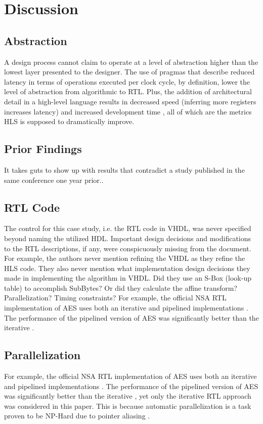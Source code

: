 \documentclass[11pt,journal,compsoc, onecolumn]{IEEEtran}
\begin{document}
\section{Discussion}
\subsection{Abstraction}
A design process cannot claim to operate at a level of abstraction higher than the lowest layer presented to the designer. The use of pragmas that describe reduced latency in terms of operations executed per clock cycle, by definition, lower the level of abstraction from algorithmic to RTL. Plus, the addition of architectural detail in a high-level language results in decreased speed (inferring more registers increases latency) and increased development time \cite{bsv}, all of which are the metrics HLS is supposed to dramatically improve.
\subsection{Prior Findings}
It takes guts to show up with results that contradict a study published in the same conference one year prior\cite{skalicky}..
\subsection{RTL Code}\label{sec:rtl}
The control for this case study, i.e. the RTL code in VHDL, was never specified beyond naming the utilized HDL. Important design decisions and modifications to the RTL descriptions, if any, were conspicuously missing from the document. For example, the authors never mention refining the VHDL as they refine the HLS code. They also never mention what implementation design decisions they made in implementing the algorithm in VHDL. Did they use an S-Box (look-up table) to accomplish SubBytes? Or did they calculate the affine transform? Parallelization? Timing constraints?  
For example, the official NSA RTL implementation of AES uses both an iterative and pipelined implementations \cite{nsa}. The performance of the pipelined version of AES was significantly better than the iterative \cite{nsaweeks}.
\subsection{Parallelization}
For example, the official NSA RTL implementation of AES uses both an iterative and pipelined implementations \cite{nsa}. The performance of the pipelined version of AES was significantly better than the iterative \cite{nsaweeks}, yet only the iterative RTL approach was considered in this paper. This is because automatic parallelization is a task proven to be NP-Hard due to pointer aliasing \cite{aliasinghard}.
\end{document}
